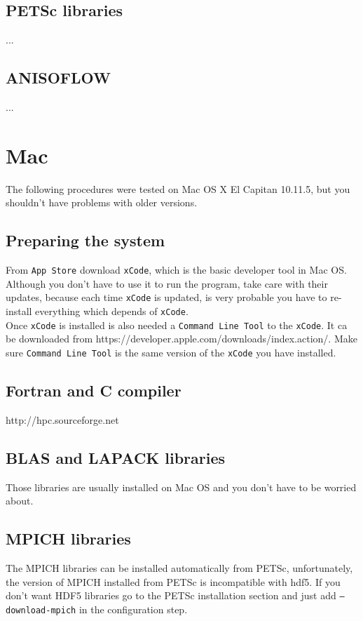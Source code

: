 \subsection{PETSc libraries}
...
\subsection{ANISOFLOW}
...
\section{Mac}
The following procedures were tested on Mac OS X El Capitan 10.11.5, but you shouldn't have problems with older versions.

\subsection{Preparing the system}
From \texttt{App Store} download \texttt{xCode}, which is the basic developer tool in Mac OS. Although you don't have to use it to run the program, take care with their updates, because each time \texttt{xCode} is updated, is very probable you have to re-install everything which depends of \texttt{xCode}.\\

Once \texttt{xCode} is installed is also needed a \texttt{Command Line Tool} to the \texttt{xCode}. It ca be downloaded from https://developer.apple.com/downloads/index.action/. Make sure \texttt{Command Line Tool} is the same version of the \texttt{xCode} you have installed.

\subsection{Fortran and C compiler}
http://hpc.sourceforge.net
\subsection{BLAS and LAPACK libraries}
Those libraries are usually installed on Mac OS and you don't have to be worried about.
\subsection{MPICH libraries}
The MPICH libraries can be installed automatically from PETSc, unfortunately, the version of MPICH installed from PETSc is incompatible with hdf5. If you don't want HDF5 libraries go to the PETSc installation section and just add \texttt{--download-mpich} in the configuration step.


